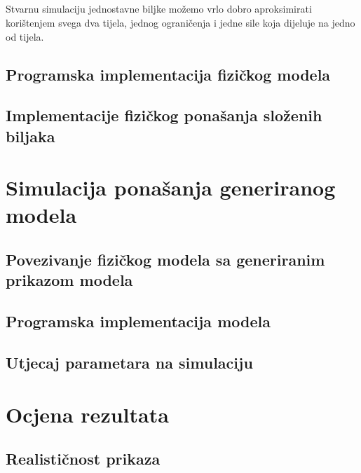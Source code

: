 \documentclass[times, utf8, diplomski]{fer}
\begin{document}
\paragraph{}
Stvarnu simulaciju jednostavne biljke možemo vrlo dobro aproksimirati korištenjem svega dva tijela, jednog ograničenja i jedne sile koja dijeluje na jedno od tijela.

\section{Programska implementacija fizičkog modela}

\section{Implementacije fizičkog ponašanja složenih biljaka}

\chapter{Simulacija ponašanja generiranog modela}
\section{Povezivanje fizičkog modela sa generiranim prikazom modela}

\section{Programska implementacija modela}

\section{Utjecaj parametara na simulaciju}

\chapter{Ocjena rezultata}
\section{Realističnost prikaza}
\end{document}
